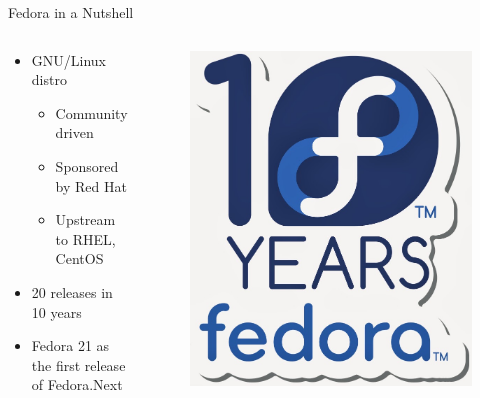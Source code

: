 \documentclass{beamer}
\begin{document}
\begin{frame}{Fedora in a Nutshell}
  \begin{columns}
    \begin{column}{.5\textwidth}
  \begin{itemize}
    \item GNU/Linux distro
      \begin{itemize}
        \item Community driven
        \item Sponsored by Red Hat
        \item Upstream to RHEL, CentOS
      \end{itemize}
    \item 20 releases in 10 years
    \item Fedora 21 as the first release of Fedora.Next
  \end{itemize}
    \end{column}
    \begin{column}{.5\textwidth}
      \begin{figure}[htbp]
        \centering
        \includegraphics[width=.6\textwidth]{tenyears.jpeg}
      \end{figure}
    \end{column}
  \end{columns}
\end{frame}
\end{document}
